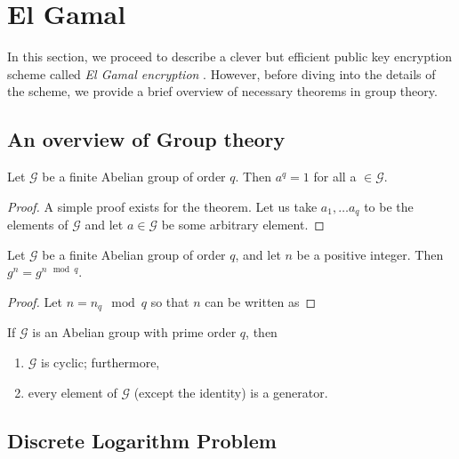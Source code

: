 \section{El Gamal}

\label{sec:elgamal} 

In this section, we proceed to describe a clever but efficient public key encryption scheme called \textit{El Gamal encryption} \cite{Elgamal_1985}. 
However, before diving into the details of the scheme, we provide a brief overview of necessary theorems in group theory.

\subsection{An overview of Group theory}

\begin{theorem}
Let $\mathcal{G}$ be a finite Abelian group of order $ q $. Then $ a^q = 1 $ for all a $\in \mathcal{G}$.
\end{theorem}

\begin{proof}
A simple proof exists for the theorem. Let us take $ a_1, \ldots a_q $ to be the elements of $\mathcal{G}$ and let $ a \in \mathcal{G} $ be some arbitrary element.

\end{proof}

\begin{corollary}
Let $ \mathcal{G} $ be a finite Abelian group of order $ q $, and let $ n $ be a positive integer.
Then $ g^n = g^{n \mod q} $.
\end{corollary}

\begin{proof}
Let $ n = n_q \mod q $ so that $ n $ can be written as 

\end{proof}

\begin{corollary}
If $ \mathcal{G} $ is an Abelian group with prime order $ q $, then 
\begin{enumerate}
    \item $ \mathcal{G} $ is cyclic; furthermore,
    \item every element of $ \mathcal{G} $ (except the identity) is a generator.
\end{enumerate}
\end{corollary}

\subsection{Discrete Logarithm Problem}

